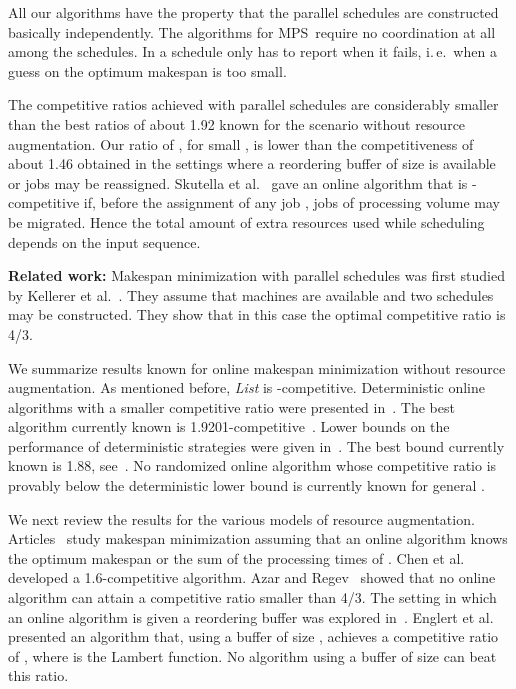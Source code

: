 \documentclass{llncs}
\newcommand{\MPSO}{{\rm MPS}}
\begin{document}
All our algorithms have the property that the parallel schedules are constructed basically independently.
The algorithms for \MPSO\ require no coordination at all among the schedules. In  
a schedule only has to report when it fails, i.\,e.\ when a guess on the optimum makespan is
too small.

The competitive ratios achieved with parallel schedules are considerably smaller than
the best ratios of about 1.92 known for the scenario without resource augmentation. Our ratio of , 
for small , is lower than the competitiveness of about 1.46 obtained in the settings where a 
reordering buffer of size  is available or  jobs may be reassigned. 
Skutella et al.~\cite{SSS} gave an online algorithm that is -competitive if,
before the assignment of any job , jobs of processing volume 
may be migrated. Hence the total amount of extra resources used while scheduling 
depends on the input sequence.



{\bf Related work:} Makespan minimization with parallel schedules was first studied by 
Kellerer et al.~\cite{KKST}. They assume that  machines are available and two schedules may
be constructed. They show that in this case the optimal competitive ratio is 4/3.

We summarize results known for online makespan minimization without resource augmentation. As mentioned before, 
{\em List\/} is -competitive. Deterministic online algorithms with a smaller competitive ratio were
presented in~\cite{A,BFKV,FW,GW,KPT}. The best algorithm currently known is 1.9201-competitive~\cite{FW}.
Lower bounds on the performance of deterministic strategies were given in~\cite{A,BKR,FKT,GRTW,R,RC}.
The best bound currently known is 1.88, see~\cite{R}. No randomized online algorithm whose competitive 
ratio is provably below the deterministic lower bound is currently known for general . 

We next review the results for the various models of resource augmentation.
Articles~\cite{ANST,AST,AST2,AR,CKK,KKST} study makespan minimization assuming that an online algorithm knows
the optimum makespan or the sum of the processing times of . Chen et al.~\cite{CKK} developed a
1.6-competitive algorithm. Azar and Regev~\cite{AR} showed that no online algorithm can attain a competitive
ratio smaller than 4/3. The setting in which an online algorithm is given a reordering buffer
was explored in~\cite{EOW,KKST}. Englert et al.~\cite{EOW} presented an algorithm that, using a buffer
of size , achieves a competitive ratio of ,
where  is the Lambert  function. No algorithm using a buffer of size  can beat 
this ratio. 
\end{document}
